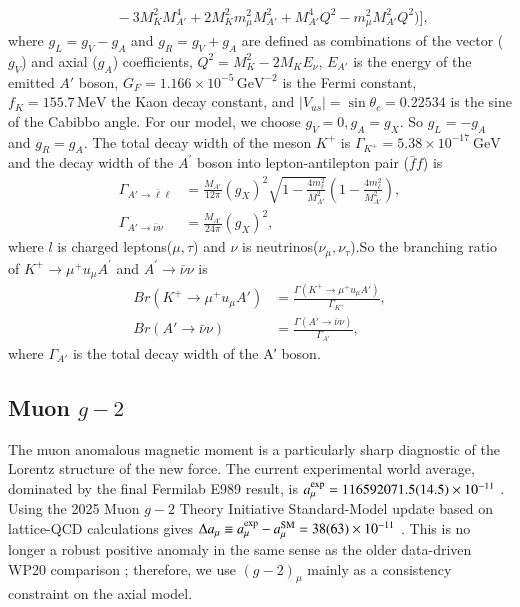 \documentclass[onecolumn, aps, nofootinbib, prd, preprint, floats, floatfix, amsmath, amssymb, superscriptaddress, preprintnumbers]{revtex4-2}
\begin{document}
{\begin{equation}
\begin{split}
&\quad - 3 M_K^2 M_{A'}^4 + 2 M_K^2 m_\mu^2 M_{A'}^2 + M_{A'}^4 Q^2 - m_\mu^2 M_{A'}^2 Q^2) \Big],
\end{split}
\end{equation}
where $g_L = g_V - g_A$ and $g_R = g_V + g_A$ are defined as combinations of the vector ($g_V$) and axial ($g_A$) coefficients, $Q^2 = M_K^2 - 2M_K E_{\nu}$, $E_{A'}$ is the energy of the emitted $A'$ boson, $G_F = 1.166 \times 10^{-5}\,\text{GeV}^{-2}$ is the Fermi constant, $f_K = 155.7\,\text{MeV}$ the Kaon decay constant, and $|V_{us}| = \sin\theta_c = 0.22534$ is the sine of the Cabibbo angle. 
For our model, we choose $g_V=0,g_A=g_X$. So $g_L = - g_A$ and $g_R = g_A$.
The total decay width of the meson $K^{+}$ is $\Gamma_{K^{+}} = 5.38 \times 10^{-17}\ \text{GeV}$ and the decay width of the $A^\prime$ boson into lepton-antilepton pair ($\bar{f}f$) is 
\begin{align}
    \Gamma_{A' \to \bar{\ell}\ell} &= \frac{M_{A'}}{12\pi} (g_X)^2 \sqrt{1 - \frac{4m_\ell^2}{M_{A'}^2}} \left(1 - \frac{4m_\ell^2}{M_{A'}^2}\right), \\
    \Gamma_{A' \to \bar{\nu}\nu} &= \frac{M_{A'}}{24\pi} (g_X)^2 ,
\end{align}
where $l$ is charged leptons($\mu,\tau$) and $\nu$ is neutrinos($\nu_\mu,\nu_\tau$).So the branching ratio of $K^{+} \rightarrow \mu^{+} u_{\mu} A^{\prime}$ and $A^{\prime} \rightarrow \bar{\nu}\nu$ is 
\begin{align}
    Br(K^+ \to \mu^+ 
u_\mu A') &= \frac{\Gamma(K^+ \to \mu^+ 
u_\mu A')}{\Gamma_{K^+}}, \\
   Br(A' \to \bar{\nu} 
\nu) &= \frac{\Gamma(A' \to \bar{\nu} 
\nu)}{\Gamma_{A'}},
\end{align}
where $\Gamma_{A'}$ is the total decay width of the A′ boson.
}

\subsection{Muon $g-2$}
\label{sec:muon_g-2}


The muon anomalous magnetic moment is a particularly sharp diagnostic of the Lorentz structure of the new force. The current experimental world average, dominated by the final Fermilab E989 result, is $a_\mu^{\rm exp}=116592071.5(14.5)\times10^{-11}$ \cite{Muong-2:2025xyk}. Using the 2025 Muon $g-2$ Theory Initiative Standard-Model update based on lattice-QCD calculations gives $\Delta a_\mu\equiv a_\mu^{\rm exp}-a_\mu^{\rm SM} =38(63)\times10^{-11}$ \cite{Muong-2:2025xyk,Aliberti:2025beg}. This is no longer a robust positive anomaly in the same sense as the older data-driven WP20 comparison \cite{Aoyama:2020ynm}; therefore, we use $(g-2)_\mu$ mainly as a consistency constraint on the axial model.
\end{document}
